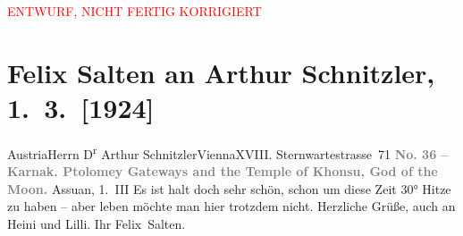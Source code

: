 
\begin{center}
            \textcolor{red}{ENTWURF, NICHT FERTIG KORRIGIERT}
                      \end{center}
            
         
         \renewcommand{\erwaehntePersonen}{Personen: Heinrich Schnitzler, Lilly Schnitzler}
         \renewcommand{\erwaehnteOrte}{Orte: Assuan, Karnak Tempelanlage, Old Cataract Hotel, Sternwartestraße, Wien, Ägypten, Österreich}
         \renewcommand{\erwaehnteWerke}{}
               \section[Felix Salten an Arthur Schnitzler, 1. 3. {[}1924{]}]{ Felix Salten an Arthur Schnitzler, 1. 3. {[}1924{]}}\nopagebreak{}\rehead{ }\begin{ledgroupsized}[t]{13cm}\normalsize\beginnumbering \toendnotes[C]{\smallbreak\pagebreak[2]} 
\pstart{}{\pb}Austria\pend{}\pstart{}Herrn D\textsuperscript{r} Arthur Schnitzler\pend{}\pstart{}Vienna\pend{}\pstart{}XVIII. Sternwartestrasse 71\pend{}{\bigskip}\pstart
           \noindent{}{\pb}\textcolor{gray}{\textbf{No. 36 – Karnak. Ptolomey
                        Gateways and the Temple of Khonsu, God of the Moon.}}\pend
           \pstart
           \raggedleft{}{\pb}Assuan, 1. III\pend
           \pstart
           Es ist halt doch sehr schön, schon um diese Zeit 30° Hitze zu haben – aber leben
               möchte man hier trotzdem nicht. Herzliche Grüße, auch an Heini und Lilli.
               Ihr\pend
           \pstart \spacefill\mbox{Felix Salten.}\pend{}
         
         \endnumbering{}\end{ledgroupsized}\begin{anhang}\end{anhang}\newcommand{\dateiname}{L03594}\newcommand{\titel}{Felix Salten an Arthur Schnitzler, 1. 3. [1924]}\newcommand{\editorInnen}{Martin Anton Müller und Laura Untner}
      